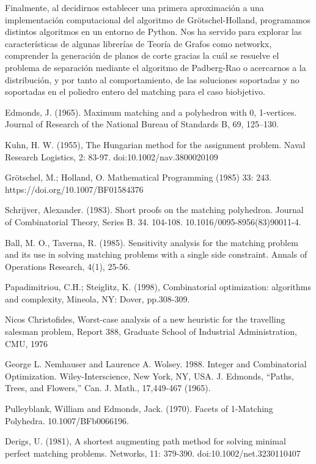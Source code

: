 \documentclass[twoside,a4paper,openright,12pt]{book}
\begin{document}
Finalmente, al decidirnos establecer una primera aproximación a una implementación computacional del algoritmo de Grötschel-Holland, programamos distintos algoritmos en un entorno de Python. Nos ha servido para explorar las características de algunas librerías de Teoría de Grafos como networkx, comprender la generación de planos de corte gracias la cuál se resuelve el problema de separación mediante el algoritmo de Padberg-Rao o acercarnos a la distribución, y por tanto al comportamiento, de las soluciones soportadas y no soportadas en el poliedro entero del matching para el caso biobjetivo. 
\begin{thebibliography}{9}
Edmonds, J. (1965). Maximum matching and a polyhedron with 0, 1-vertices. Journal of Research of the National Bureau of Standards B, 69, 125--130. 

Kuhn, H. W. (1955), The Hungarian method for the assignment problem. Naval Research Logistics, 2: 83-97. doi:10.1002/nav.3800020109
  
Grötschel, M.; Holland, O. Mathematical Programming (1985) 33: 243. https://doi.org/10.1007/BF01584376

Schrijver, Alexander. (1983). Short proofs on the matching polyhedron. Journal of Combinatorial Theory, Series B. 34. 104-108. 10.1016/0095-8956(83)90011-4. 
 
Ball, M. O.,  Taverna, R. (1985). Sensitivity analysis for the matching problem and its use in solving matching problems with a single side constraint. Annals of Operations Research, 4(1), 25-56.

Papadimitriou, C.H.; Steiglitz, K. (1998), Combinatorial optimization: algorithms and complexity, Mineola, NY: Dover, pp.308-309.

Nicos Christofides, Worst-case analysis of a new heuristic for the travelling salesman problem, Report 388, Graduate School of Industrial Administration, CMU, 1976

George L. Nemhauser and Laurence A. Wolsey. 1988. Integer and Combinatorial Optimization. Wiley-Interscience, New York, NY, USA.
J. Edmonds, “Paths, Trees, and Flowers,” Can. J. Math., 17,449-467 (1965).

Pulleyblank, William and Edmonds, Jack. (1970). Facets of 1-Matching Polyhedra. 10.1007/BFb0066196. 

Derigs, U. (1981), A shortest augmenting path method for solving minimal perfect matching problems. Networks, 11: 379-390. doi:10.1002/net.3230110407


\end{thebibliography}
\end{document}

